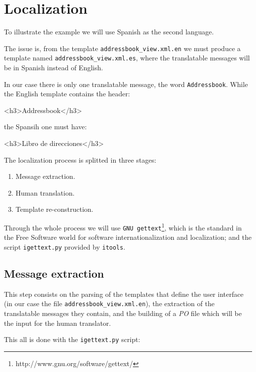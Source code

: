 \section{Localization}

To illustrate the example we will use Spanish as the second language.

The issue is, from the template {\tt addressbook\_view.xml.en} we
must produce a template named {\tt addressbook\_view.xml.es}, where
the translatable messages will be in Spanish instead of English.

In our case there is only one translatable message, the word
{\tt Addressbook}. While the English template contains the header:

\begin{code}
    <h3>Addressbook</h3>
\end{code}

the Spansih one must have:

\begin{code}
    <h3>Libro de direcciones</h3>
\end{code}

The localization process is splitted in three stages:

\begin{enumerate}
  \item Message extraction.
  \item Human translation.
  \item Template re-construction.
\end{enumerate}

Through the whole process we will use {\tt GNU
gettext}\footnote{http://www.gnu.org/software/gettext/}, which is the
standard in the Free Software world for software internationalization
and localization; and the script {\tt igettext.py} provided by {\tt itools}.


\subsection{Message extraction}

This step consists on the parsing of the templates that define the user
interface (in our case the file {\tt addressbook\_view.xml.en}), the
extraction of the translatable messages they contain, and the building of
a {\em PO} file which will be the input for the human translator.

This all is done with the {\tt igettext.py} script:


